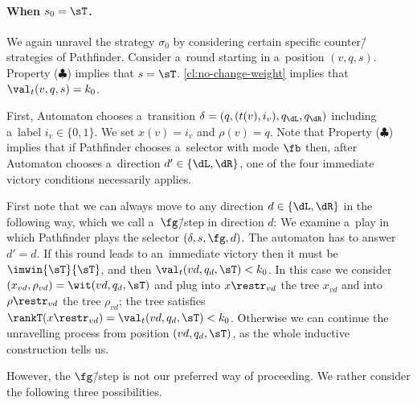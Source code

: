 \documentclass{lmcs}
\numberwithin{equation}{section}
\numberwithin{figure}{section}
\begin{document}
\paragraph*{When $s_0=\sT$.}

We again unravel the strategy $\sigma_0$ by considering certain specific counter\=/strategies of Pathfinder.
Consider a~round starting in a~position $(v,q,s)$.
Property ($\clubsuit$) implies that $s=\sT$.
\cref{cl:no-change-weight} implies that $\val_t(v,q,s)=k_0$.

First, Automaton chooses a~transition $\delta=(q,(t(v),i_v),q_\dL,q_\dR)$ including a~label $i_v\in\{0,1\}$.
We set $x(v)=i_v$ and $\rho(v)=q$.
Note that Property ($\clubsuit$) implies that if Pathfinder chooses a~selector with mode $\fb$
then, after Automaton chooses a~direction $d'\in\{\dL,\dR\}$, one of the four immediate victory conditions necessarily applies.

First note that we can always move to any direction $d\in\{\dL,\dR\}$ in the following way, which we call a~$\fg$\=/step in direction $d$:
We examine a~play in which Pathfinder plays the selector $(\delta,s,\fg,d)$.
The automaton has to answer $d'=d$.
If this round leads to an~immediate victory then it must be $\imwin{\sT}{\sT}$, and then $\val_t(vd,q_d,\sT)<k_0$.
In this case we consider $(x_{vd},\rho_{vd})=\wit(vd,q_d,\sT)$ and plug into $x\restr_{vd}$ the tree $x_{vd}$ and into $\rho\restr_{vd}$ the tree $\rho_{vd}$;
the tree satisfies $\rankT(x\restr_{vd})=\val_t(vd,q_{d},\sT)<k_0$.
Otherwise we can continue the unravelling process from position $(vd,q_d,\sT)$, as the whole inductive construction tells us.

However, the $\fg$\=/step is not our preferred way of proceeding.
We rather consider the following three possibilities.
\end{document}
